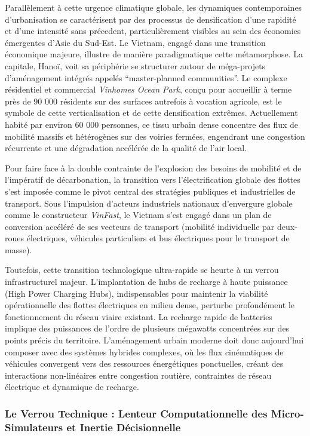 \documentclass[10pt, a4paper]{article}
\begin{document}
Parallèlement à cette urgence climatique globale, les dynamiques
contemporaines d'urbanisation se caractérisent par des processus de
densification d'une rapidité et d'une intensité sans précedent,
particulièrement visibles au sein des économies émergentes d'Asie du
Sud-Est. Le Vietnam, engagé dans une transition économique majeure,
illustre de manière paradigmatique cette métamorphose. La capitale,
Hanoï, voit sa périphérie se structurer autour de méga-projets
d'aménagement intégrés appelés ``master-planned communities''. Le
complexe résidentiel et commercial \emph{Vinhomes Ocean Park}, conçu
pour accueillir à terme près de 90 000 résidents sur des surfaces
autrefois à vocation agricole, est le symbole de cette verticalisation
et de cette densification extrêmes. Actuellement habité par environ 60
000 personnes, ce tissu urbain dense concentre des flux de mobilité
massifs et hétérogènes sur des voiries fermées, engendrant une
congestion récurrente et une dégradation accélérée de la qualité de
l'air local.

Pour faire face à la double contrainte de l'explosion des besoins de
mobilité et de l'impératif de décarbonation, la transition vers
l'électrification globale des flottes s'est imposée comme le pivot
central des stratégies publiques et industrielles de transport. Sous
l'impulsion d'acteurs industriels nationaux d'envergure globale comme le
constructeur \emph{VinFast}, le Vietnam s'est engagé dans un plan de
conversion accéléré de ses vecteurs de transport (mobilité individuelle
par deux-roues électriques, véhicules particuliers et bus électriques
pour le transport de masse).

Toutefois, cette transition technologique ultra-rapide se heurte à un
verrou infrastructurel majeur. L'implantation de hubs de recharge à
haute puissance (High Power Charging Hubs), indispensables pour
maintenir la viabilité opérationnelle des flottes électriques en milieu
dense, perturbe profondément le fonctionnement du réseau viaire
existant. La recharge rapide de batteries implique des puissances de
l'ordre de plusieurs mégawatts concentrées sur des points précis du
territoire. L'aménagement urbain moderne doit donc aujourd'hui composer
avec des systèmes hybrides complexes, où les flux cinématiques de
véhicules convergent vers des ressources énergétiques ponctuelles,
créant des interactions non-linéaires entre congestion routière,
contraintes de réseau électrique et dynamique de recharge.

\subsubsection{Le Verrou Technique : Lenteur Computationnelle des
Micro-Simulateurs et Inertie
Décisionnelle}\label{le-verrou-technique-lenteur-computationnelle-des-micro-simulateurs-et-inertie-duxe9cisionnelle}
\end{document}
